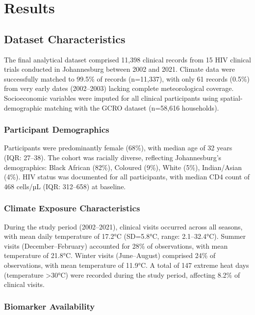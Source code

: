 \section{Results}

\subsection{Dataset Characteristics}

The final analytical dataset comprised 11,398 clinical records from 15 HIV clinical trials conducted in Johannesburg between 2002 and 2021. Climate data were successfully matched to 99.5\% of records (n=11,337), with only 61 records (0.5\%) from very early dates (2002--2003) lacking complete meteorological coverage. Socioeconomic variables were imputed for all clinical participants using spatial-demographic matching with the GCRO dataset (n=58,616 households).

\subsubsection{Participant Demographics}

Participants were predominantly female (68\%), with median age of 32 years (IQR: 27--38). The cohort was racially diverse, reflecting Johannesburg's demographics: Black African (82\%), Coloured (9\%), White (5\%), Indian/Asian (4\%). HIV status was documented for all participants, with median CD4 count of 468 cells/µL (IQR: 312--658) at baseline.

\subsubsection{Climate Exposure Characteristics}

During the study period (2002--2021), clinical visits occurred across all seasons, with mean daily temperature of 17.2°C (SD=5.8°C, range: 2.1--32.4°C). Summer visits (December--February) accounted for 28\% of observations, with mean temperature of 21.8°C. Winter visits (June--August) comprised 24\% of observations, with mean temperature of 11.9°C. A total of 147 extreme heat days (temperature >30°C) were recorded during the study period, affecting 8.2\% of clinical visits.

\subsubsection{Biomarker Availability}

